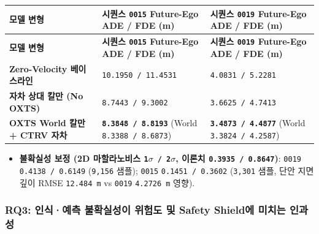 \documentclass[10.5pt,a4paper]{article}
\begin{document}
\begin{footnotesize}
\setlength{\tabcolsep}{4pt}
\setlength{\LTleft}{0pt}\setlength{\LTright}{0pt}
\begin{longtable}{>{\raggedright\arraybackslash}p{} >{\raggedright\arraybackslash}p{} >{\raggedright\arraybackslash}p{}}
\toprule
\textbf{모델 변형} & \textbf{시퀀스 \texttt{0015} Future-Ego ADE / FDE (m)} & \textbf{시퀀스 \texttt{0019} Future-Ego ADE / FDE (m)} \\
\midrule
\endfirsthead
\toprule
\textbf{모델 변형} & \textbf{시퀀스 \texttt{0015} Future-Ego ADE / FDE (m)} & \textbf{시퀀스 \texttt{0019} Future-Ego ADE / FDE (m)} \\
\midrule
\endhead
\bottomrule
\endfoot
\textbf{Zero-Velocity 베이스라인} & \texttt{10.\allowbreak{}1950 /\allowbreak{} 11.\allowbreak{}4531} & \texttt{4.\allowbreak{}0831 /\allowbreak{} 5.\allowbreak{}2281} \\
\textbf{자차 상대 칼만 (No OXTS)} & \texttt{8.\allowbreak{}7443 /\allowbreak{} 9.\allowbreak{}3002} & \texttt{3.\allowbreak{}6625 /\allowbreak{} 4.\allowbreak{}7413} \\
\textbf{OXTS World 칼만 + CTRV 자차} & \textbf{\texttt{8.\allowbreak{}3848 /\allowbreak{} 8.\allowbreak{}8193}} (World \texttt{8.\allowbreak{}3388 /\allowbreak{} 8.\allowbreak{}6873}) & \textbf{\texttt{3.\allowbreak{}4873 /\allowbreak{} 4.\allowbreak{}4877}} (World \texttt{3.\allowbreak{}3824 /\allowbreak{} 4.\allowbreak{}2587}) \\
\end{longtable}
\end{footnotesize}


\begin{itemize}[leftmargin=1.5em,itemsep=2pt]
\item \textbf{불확실성 보정 (2D 마할라노비스 \texttt{1$\sigma$ /\allowbreak{} 2$\sigma$}, 이론치 \texttt{0.\allowbreak{}3935 /\allowbreak{} 0.\allowbreak{}8647})}: \texttt{0019} \texttt{0.\allowbreak{}4138 /\allowbreak{} 0.\allowbreak{}6149} (\texttt{9,\allowbreak{}156} 샘플); \texttt{0015} \texttt{0.\allowbreak{}1451 /\allowbreak{} 0.\allowbreak{}3602} (\texttt{3,\allowbreak{}301} 샘플, 단안 지면 깊이 RMSE \texttt{12.\allowbreak{}484 m} vs \texttt{0019} \texttt{4.\allowbreak{}2726 m} 영향).
\end{itemize}

\subsubsection{RQ3: 인식·예측 불확실성이 위험도 및 Safety Shield에 미치는 인과성}
\end{document}
